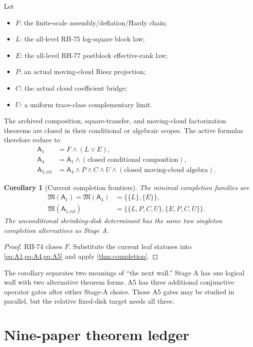 \documentclass[11pt]{article}
\newtheorem{corollary}[theorem]{Corollary}
\theoremstyle{definition}
\theoremstyle{remark}
\newcommand{\M}{\mathfrak M}
\newcommand{\A}{\mathsf A}
\begin{document}
Let
\begin{itemize}[leftmargin=2em]
 \item $F$: the finite-scale assembly/deflation/Hardy chain;
 \item $L$: the all-level RH-75 log-square block law;
 \item $E$: the all-level RH-77 postblock effective-rank law;
 \item $P$: an actual moving-cloud Riesz projection;
 \item $C$: the actual cloud coefficient bridge;
 \item $U$: a uniform trace-class complementary limit.
\end{itemize}
The archived composition, square-transfer, and moving-cloud factorization
theorems are closed in their conditional or algebraic scopes.  The active
formulas therefore reduce to
\begin{align}
 \A_1&=F\wedge(L\vee E), \label{eq:A1}\\
 \A_4&=\A_1\wedge(\text{closed conditional composition}), \label{eq:A4}\\
 \A_{5,\mathrm{rel}}&=\A_4\wedge P\wedge C\wedge U
 \wedge(\text{closed moving-cloud algebra}). \label{eq:A5}
\end{align}

\begin{corollary}[Current completion frontiers]
\label{cor:frontiers}
The minimal completion families are
\begin{align*}
 \M(\A_1)=\M(\A_4)
 &=\bigl\{\{L\},\{E\}\bigr\},\\
 \M(\A_{5,\mathrm{rel}})
 &=\bigl\{\{L,P,C,U\},\{E,P,C,U\}\bigr\}.
\end{align*}
The unconditional shrinking-disk determinant has the same two singleton
completion alternatives as Stage A.
\end{corollary}

\begin{proof}
RH-74 closes $F$.  Substitute the current leaf statuses into
\cref{eq:A1,eq:A4,eq:A5} and apply \cref{thm:completion}.
\end{proof}

The corollary separates two meanings of ``the next wall.''  Stage A has one
logical wall with two alternative theorem forms.  A5 has three additional
conjunctive operator gates after either Stage-A choice.  Those A5 gates may be
studied in parallel, but the relative fixed-disk target needs all three.

\section{Nine-paper theorem ledger}
\end{document}
